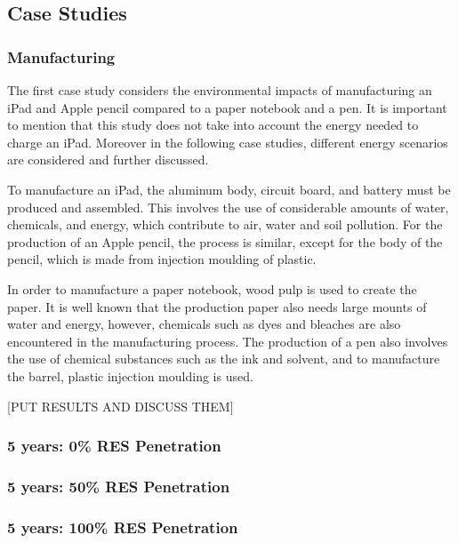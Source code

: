 \subsection{Case Studies}\label{subsec:case_studies}

\subsubsection*{Manufacturing}
The first case study considers the environmental impacts of manufacturing an iPad and Apple pencil compared to a paper notebook and a pen. It is important to mention that this study does not take into account the energy needed to charge an iPad. Moreover in the following case studies, different energy scenarios are considered and further discussed. 

To manufacture an iPad, the aluminum body, circuit board, and battery must be produced and assembled. This involves the use of considerable amounts of water, chemicals, and energy, which contribute to air, water and soil pollution. For the production of an Apple pencil, the process is similar, except for the body of the pencil, which is made from injection moulding of plastic. 

In order to manufacture a paper notebook, wood pulp is used to create the paper. It is well known that the production paper also needs large mounts of water and energy, however, chemicals such as dyes and bleaches are also encountered in the manufacturing process. The production of a pen also involves the use of chemical substances such as the ink and solvent, and to manufacture the barrel, plastic injection moulding is used. 

[PUT RESULTS AND DISCUSS THEM]

\subsubsection*{5 years: 0\% RES Penetration}

\subsubsection*{5 years: 50\% RES Penetration}

\subsubsection*{5 years: 100\% RES Penetration}
